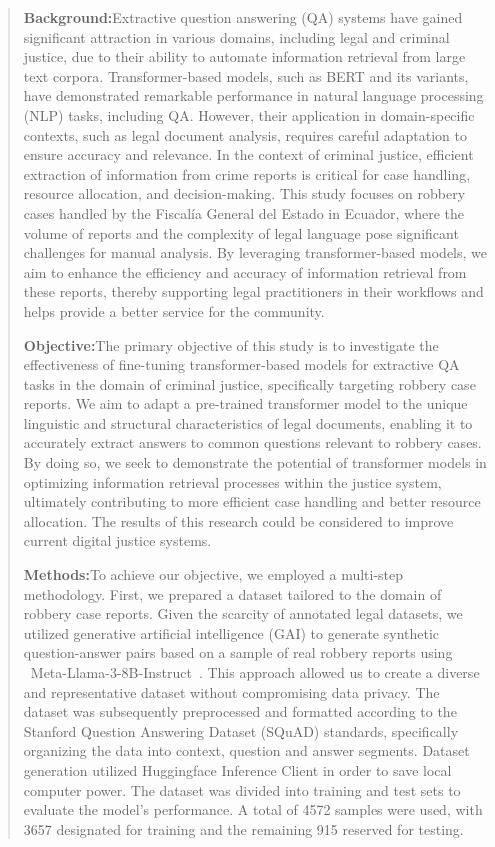 \documentclass[journal]{article}
\newcommand{\abstractsection}[2]{\noindent\textbf{#1:}#2\par\vspace{0.5em}}
\begin{document}
\begin{abstract}


\abstractsection{Background}{Extractive question answering (QA) systems have gained significant attraction in various domains, including legal and criminal justice, due to their ability to automate information retrieval from large text corpora. Transformer-based models, such as BERT and its variants, have demonstrated remarkable performance in natural language processing (NLP) tasks, including QA. However, their application in domain-specific contexts, such as legal document analysis, requires careful adaptation to ensure accuracy and relevance. In the context of criminal justice, efficient extraction of information from crime reports is critical for case handling, resource allocation, and decision-making. This study focuses on robbery cases handled by the Fiscalía General del Estado in Ecuador, where the volume of reports and the complexity of legal language pose significant challenges for manual analysis. By leveraging transformer-based models, we aim to enhance the efficiency and accuracy of information retrieval from these reports, thereby supporting legal practitioners in their workflows and helps provide a better service for the community.}

    \abstractsection{Objective}{The primary objective of this study is to investigate the effectiveness of fine-tuning transformer-based models for extractive QA tasks in the domain of criminal justice, specifically targeting robbery case reports. We aim to adapt a pre-trained transformer model to the unique linguistic and structural characteristics of legal documents, enabling it to accurately extract answers to common questions relevant to robbery cases. By doing so, we seek to demonstrate the potential of transformer models in optimizing information retrieval processes within the justice system, ultimately contributing to more efficient case handling and better resource allocation. The results of this research could be considered to improve current digital justice systems.}

    \abstractsection{Methods}{To achieve our objective, we employed a multi-step methodology. First, we prepared a dataset tailored to the domain of robbery case reports. Given the scarcity of annotated legal datasets, we utilized generative artificial intelligence (GAI) to generate synthetic question-answer pairs based on a sample of real robbery reports using ~Meta-Llama-3-8B-Instruct~. This approach allowed us to create a diverse and representative dataset without compromising data privacy. The dataset was subsequently preprocessed and formatted according to the Stanford Question Answering Dataset (SQuAD) standards, specifically organizing the data into context, question and answer segments. Dataset generation utilized Huggingface Inference Client in order to save local computer power. The dataset was divided into training and test sets to evaluate the model's performance. A total of 4572 samples were used, with 3657 designated for training and the remaining 915 reserved for testing.

}
\end{abstract}
\end{document}
